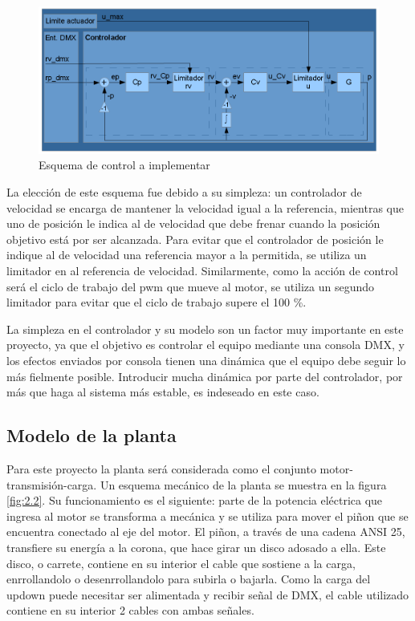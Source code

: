 \begin{figure}[!ht]
	\centering
	\includegraphics[width=16cm,scale=1]{resources/2_1-diagramaControlador.png}
	\caption{Esquema de control a implementar}
	\label{fig:\thefigure}
\end{figure}

La elección de este esquema fue debido a su simpleza: un controlador de velocidad se encarga de mantener la velocidad igual a la referencia, mientras que uno de posición le indica al de velocidad que debe frenar cuando la posición objetivo está por ser alcanzada. Para evitar que el controlador de posición le indique al de velocidad una referencia mayor a la permitida, se utiliza un limitador en al referencia de velocidad. Similarmente, como la acción de control será el ciclo de trabajo del pwm que mueve al motor, se utiliza un segundo limitador para evitar que el ciclo de trabajo supere el 100 \%.

La simpleza en el controlador y su modelo son un factor muy importante en este proyecto, ya que el objetivo es controlar el equipo mediante una consola DMX, y los efectos enviados por consola tienen una dinámica que el equipo debe seguir lo más fielmente posible. Introducir mucha dinámica por parte del controlador, por más que haga al sistema más estable, es indeseado en este caso. 

\subsection{Modelo de la planta}
Para este proyecto la planta será considerada como el conjunto motor-transmisión-carga. Un esquema mecánico de la planta se muestra en la figura \ref{fig:2.2}. Su funcionamiento es el siguiente: parte de la potencia eléctrica que ingresa al motor se transforma a mecánica y se utiliza para mover el piñon que se encuentra conectado al eje del motor. El piñon, a través de una cadena ANSI 25, transfiere su energía a la corona, que hace girar un disco adosado a ella. Este disco, o carrete, contiene en su interior el cable que sostiene a la carga, enrrollandolo o desenrrollandolo para subirla o bajarla. Como la carga del updown puede necesitar ser alimentada y recibir señal de DMX, el cable utilizado contiene en su interior 2 cables con ambas señales.

